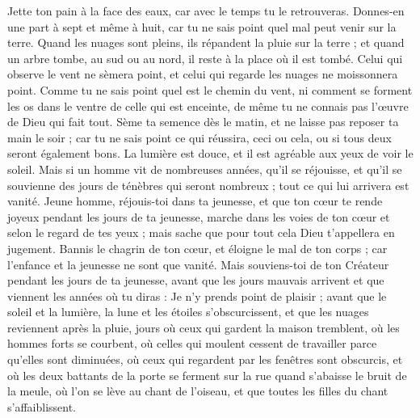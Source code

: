 \begin{multicols}{2}
\VerseOne{}Jette ton pain à la face des eaux, car avec le temps tu le retrouveras.
Donnes-en une part à sept et même à huit, car tu ne sais point quel mal peut venir sur la terre.
Quand les nuages sont pleins, ils répandent la pluie sur la terre ; et quand un arbre tombe, au sud ou au nord, il reste à la place où il est tombé.
Celui qui observe le vent ne sèmera point, et celui qui regarde les nuages ne moissonnera point.
Comme tu ne sais point quel est le chemin du vent, ni comment se forment les os dans le ventre de celle qui est enceinte, de même tu ne connais pas l'œuvre de Dieu qui fait tout.
Sème ta semence dès le matin, et ne laisse pas reposer ta main le soir ; car tu ne sais point ce qui réussira, ceci ou cela, ou si tous deux seront également bons.
La lumière est douce, et il est agréable aux yeux de voir le soleil.
Mais si un homme vit de nombreuses années, qu'il se réjouisse, et qu'il se souvienne des jours de ténèbres qui seront nombreux ; tout ce qui lui arrivera est vanité.
\VerseOne{}Jeune homme, réjouis-toi dans ta jeunesse, et que ton cœur te rende joyeux pendant les jours de ta jeunesse, marche dans les voies de ton cœur et selon le regard de tes yeux ; mais sache que pour tout cela Dieu t’appellera en jugement.
Bannis le chagrin de ton cœur, et éloigne le mal de ton corps ; car l’enfance et la jeunesse ne sont que vanité.
Mais souviens-toi de ton Créateur pendant les jours de ta jeunesse, avant que les jours mauvais arrivent et que viennent les années où tu diras : Je n'y prends point de plaisir ;
avant que le soleil et la lumière, la lune et les étoiles s'obscurcissent, et que les nuages reviennent après la pluie,
jours où ceux qui gardent la maison tremblent, où les hommes forts se courbent, où celles qui moulent cessent de travailler parce qu'elles sont diminuées, où ceux qui regardent par les fenêtres sont obscurcis,
et où les deux battants de la porte se ferment sur la rue quand s’abaisse le bruit de la meule, où l’on se lève au chant de l'oiseau, et que toutes les filles du chant s’affaiblissent.

\end{multicols}
